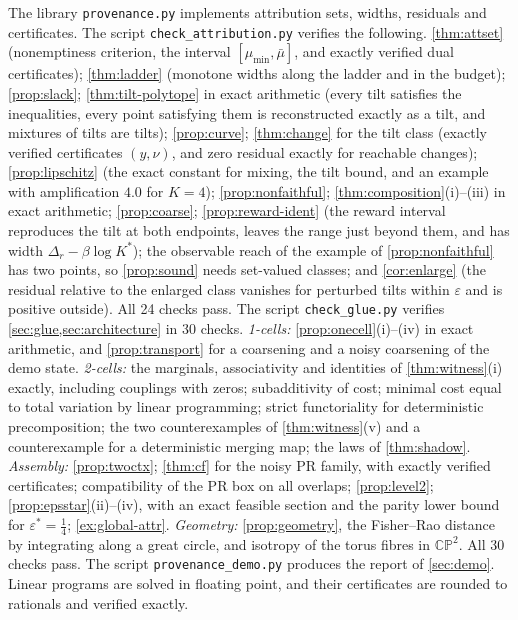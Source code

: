 \documentclass[11pt]{article}
\theoremstyle{definition}
\theoremstyle{remark}
\begin{document}
The library \texttt{provenance.py} implements attribution sets, widths, residuals and certificates.
The script \texttt{check\allowbreak\_attribution.py} verifies the following.
\cref{thm:attset} (nonemptiness criterion, the interval $[\mu_{\min},\bar\mu]$, and exactly verified dual
certificates); \cref{thm:ladder} (monotone widths along the ladder and in the budget);
\cref{prop:slack}; \cref{thm:tilt-polytope} in exact arithmetic (every tilt satisfies the inequalities,
every point satisfying them is reconstructed exactly as a tilt, and mixtures of tilts are tilts);
\cref{prop:curve}; \cref{thm:change} for the tilt class (exactly verified certificates $(y,\nu)$, and
zero residual exactly for reachable changes); \cref{prop:lipschitz} (the exact constant for mixing, the
tilt bound, and an example with amplification $4.0$ for $K=4$); \cref{prop:nonfaithful};
\cref{thm:composition}(i)--(iii) in exact arithmetic; \cref{prop:coarse}; \cref{prop:reward-ident} (the
reward interval reproduces the tilt at both endpoints, leaves the range just beyond them, and has
width $\Delta_r-\beta\log K^*$); the observable reach of the example of \cref{prop:nonfaithful} has two
points, so \cref{prop:sound} needs set-valued classes; and \cref{cor:enlarge} (the residual relative
to the enlarged class vanishes for perturbed tilts within $\varepsilon$ and is positive outside). All 24
checks pass.
The script \texttt{check\allowbreak\_glue.py} verifies \cref{sec:glue,sec:architecture} in 30 checks.
\emph{1-cells:} \cref{prop:onecell}(i)--(iv) in exact arithmetic, and \cref{prop:transport} for a
coarsening and a noisy coarsening of the demo state. \emph{2-cells:} the marginals, associativity and
identities of \cref{thm:witness}(i) exactly, including couplings with zeros; subadditivity of cost; minimal
cost equal to total variation by linear programming; strict functoriality for deterministic
precomposition; the two counterexamples of \cref{thm:witness}(v) and a counterexample for a deterministic
merging map; the laws of \cref{thm:shadow}. \emph{Assembly:} \cref{prop:twoctx}; \cref{thm:cf} for the
noisy PR family, with exactly verified certificates; compatibility of the PR box on all overlaps;
\cref{prop:level2}; \cref{prop:epsstar}(ii)--(iv), with an exact feasible section and the parity lower
bound for $\varepsilon^*=\tfrac14$; \cref{ex:global-attr}. \emph{Geometry:} \cref{prop:geometry}, the
Fisher--Rao distance by integrating along a great circle, and isotropy of the torus fibres in
$\mathbb{CP}^2$. All 30 checks pass.
The script \texttt{provenance\allowbreak\_demo.py} produces the report of \cref{sec:demo}. Linear programs are solved in
floating point, and their certificates are rounded to rationals and verified exactly.
\end{document}

